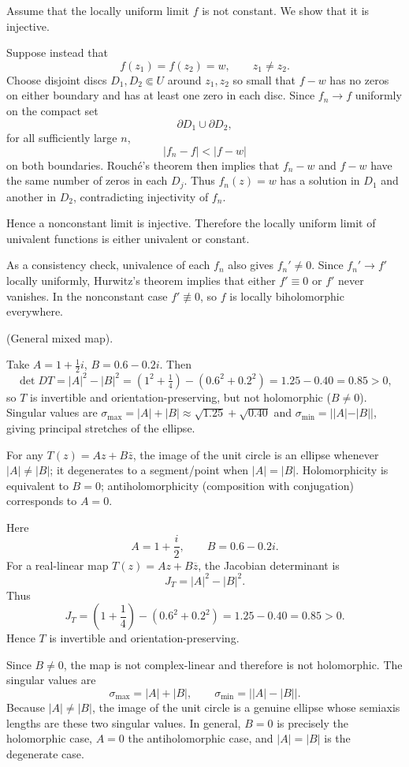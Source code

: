 \begin{solution}
Assume that the locally uniform limit \(f\) is not constant. We show that it is injective.

Suppose instead that
\[
f(z_1)=f(z_2)=w,
\qquad z_1\neq z_2.
\]
Choose disjoint discs \(D_1,D_2\Subset U\) around \(z_1,z_2\) so small that \(f-w\) has no zeros on either boundary and has at least one zero in each disc. Since \(f_n\to f\) uniformly on the compact set
\[
\partial D_1\cup\partial D_2,
\]
for all sufficiently large \(n\),
\[
|f_n-f|<|f-w|
\]
on both boundaries. Rouch\'e's theorem then implies that \(f_n-w\) and \(f-w\) have the same number of zeros in each \(D_j\). Thus \(f_n(z)=w\) has a solution in \(D_1\) and another in \(D_2\), contradicting injectivity of \(f_n\).

Hence a nonconstant limit is injective. Therefore the locally uniform limit of univalent functions is either univalent or constant.

As a consistency check, univalence of each \(f_n\) also gives \(f_n'\neq0\). Since \(f_n'\to f'\) locally uniformly, Hurwitz's theorem implies that either \(f'\equiv0\) or \(f'\) never vanishes. In the nonconstant case \(f'\not\equiv0\), so \(f\) is locally biholomorphic everywhere.
\end{solution}


\begin{problem}[CP-IV-0039]
\label{prob:cp-iv-0039}
(General mixed map).

Take $A=1+\tfrac12 i$, $B=0.6-0.2i$. Then
\[
\det DT=|A|^2-|B|^2=(1^2+\tfrac{1}{4})-(0.6^2+0.2^2)=1.25-0.40=0.85>0,
\]
so $T$ is invertible and orientation-preserving, but not holomorphic ($B\neq0$).
Singular values are $\sigma_{\max}=|A|+|B|\approx \sqrt{1.25}+ \sqrt{0.40}$ and
$\sigma_{\min}=||A|-|B||$, giving principal stretches of the ellipse.

For any $T(z)=Az+B\bar z$, the image of the unit circle is an ellipse whenever $|A|\neq|B|$; it degenerates to a segment/point when $|A|=|B|$.
Holomorphicity is equivalent to $B=0$; antiholomorphicity (composition with conjugation) corresponds to $A=0$.
\end{problem}

\begin{solution}
Here
\[
A=1+\frac{i}{2},
\qquad
B=0.6-0.2i.
\]
For a real-linear map \(T(z)=Az+B\overline z\), the Jacobian determinant is
\[
J_T=|A|^2-|B|^2.
\]
Thus
\[
J_T
=
\left(1+\frac14\right)
-
\left(0.6^2+0.2^2\right)
=
1.25-0.40
=
0.85>0.
\]
Hence \(T\) is invertible and orientation-preserving.

Since \(B\neq0\), the map is not complex-linear and therefore is not holomorphic. The singular values are
\[
\sigma_{\max}=|A|+|B|,
\qquad
\sigma_{\min}=\bigl||A|-|B|\bigr|.
\]
Because \(|A|\neq|B|\), the image of the unit circle is a genuine ellipse whose semiaxis lengths are these two singular values. In general, \(B=0\) is precisely the holomorphic case, \(A=0\) the antiholomorphic case, and \(|A|=|B|\) is the degenerate case.
\end{solution}


